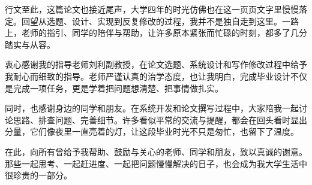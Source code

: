 \documentclass[twoside]{thesis-cls-Miya}
\begin{document}


行文至此，这篇论文也接近尾声，大学四年的时光仿佛也在这一页页文字里慢慢落定。回望从选题、设计、实现到反复修改的过程，我并不是独自走到这里。一路上，老师的指引、同学的陪伴与帮助，让许多原本紧张而忙碌的时刻，都多了几分踏实与从容。

衷心感谢我的指导老师刘利副教授，在论文选题、系统设计和写作修改过程中给予我耐心而细致的指导。老师严谨认真的治学态度，也让我明白，完成毕业设计不仅是完成一项任务，更是学着把问题想清楚、把事情做扎实。

同时，也感谢身边的同学和朋友。在系统开发和论文撰写过程中，大家陪我一起讨论思路、排查问题、完善细节。许多看似平常的交流与提醒，都会在回头看时显出分量，它们像夜里一直亮着的灯，让这段毕业时光不只是匆忙，也留下了温度。

在此，向所有曾给予我帮助、鼓励与关心的老师、同学和朋友，致以真诚的谢意。那些一起思考、一起赶进度、一起把问题慢慢解决的日子，也会成为我大学生活中很珍贵的一部分。

\clearpage

\end{document}
